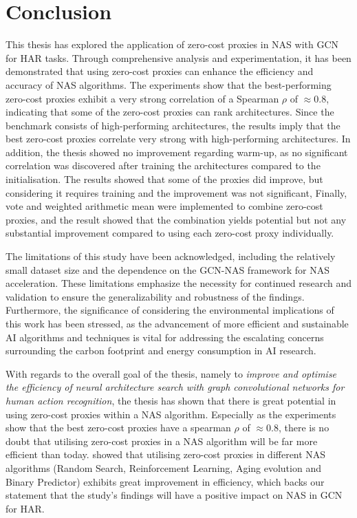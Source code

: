 \section{Conclusion}

This thesis has explored the application of zero-cost proxies in NAS with GCN for HAR tasks. Through comprehensive analysis and experimentation, it has been demonstrated that using zero-cost proxies can enhance the efficiency and accuracy of NAS algorithms. The experiments show that the best-performing zero-cost proxies exhibit a very strong correlation of a Spearman $\rho$ of $\approx 0.8$, indicating that some of the zero-cost proxies can rank architectures. Since the benchmark consists of high-performing architectures, the results imply that the best zero-cost proxies correlate very strong with high-performing architectures. In addition, the thesis showed no improvement regarding warm-up, as no significant correlation was discovered after training the architectures compared to the initialisation. The results showed that some of the proxies did improve, but considering it requires training and the improvement was not significant,  Finally, vote and weighted arithmetic mean were implemented to combine zero-cost proxies, and the result showed that the combination yields potential but not any substantial improvement compared to using each zero-cost proxy individually. 
 

The limitations of this study have been acknowledged, including the relatively small dataset size and the dependence on the GCN-NAS framework for NAS acceleration. These limitations emphasize the necessity for continued research and validation to ensure the generalizability and robustness of the findings. Furthermore, the significance of considering the environmental implications of this work has been stressed, as the advancement of more efficient and sustainable AI algorithms and techniques is vital for addressing the escalating concerns surrounding the carbon footprint and energy consumption in AI research.

With regards to the overall goal of the thesis, namely to \textit{improve and optimise the efficiency of neural architecture search with
graph convolutional networks for human action recognition}, the thesis has shown that there is great potential in using zero-cost proxies within a NAS algorithm. Especially as the experiments show that the best zero-cost proxies have a spearman $\rho$ of $\approx 0.8$, there is no doubt that utilising zero-cost proxies in a NAS algorithm will be far more efficient than today. \cite{abdelfattah2021zero} showed that utilising zero-cost proxies in different NAS algorithms (Random Search, Reinforcement Learning, Aging evolution and Binary Predictor) exhibits great improvement in efficiency, which backs our statement that the study's findings will have a positive impact on NAS in GCN for HAR.